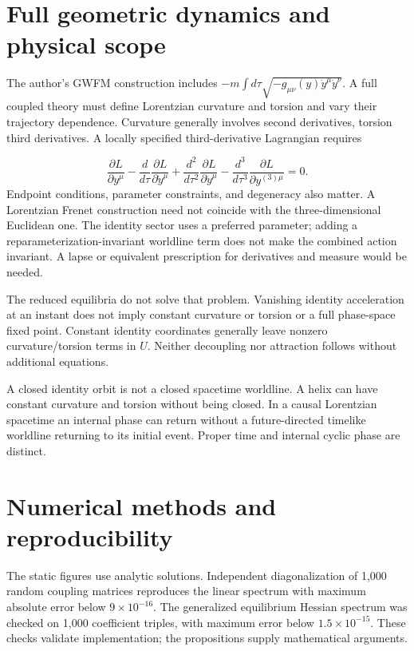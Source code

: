 \documentclass[aip,adv,preprint,floatfix]{revtex4-2}
\begin{document}
\section{Full geometric dynamics and physical scope}
The author's GWFM construction \cite{r1} includes $-m\int d\tau\sqrt{-g_{\mu\nu}(y)\dot y^\mu\dot y^\nu}$. A full coupled theory must define Lorentzian curvature and torsion and vary their trajectory dependence. Curvature generally involves second derivatives, torsion third derivatives. A locally specified third-derivative Lagrangian requires

\begin{equation}
\frac{\partial L}{\partial y^\mu}-\frac{d}{d\tau}\frac{\partial L}{\partial\dot y^\mu}+\frac{d^2}{d\tau^2}\frac{\partial L}{\partial\ddot y^\mu}-\frac{d^3}{d\tau^3}\frac{\partial L}{\partial y^{(3)\mu}}=0.
\end{equation}
Endpoint conditions, parameter constraints, and degeneracy also matter. A Lorentzian Frenet construction need not coincide with the three-dimensional Euclidean one. The identity sector uses a preferred parameter; adding a reparameterization-invariant worldline term does not make the combined action invariant. A lapse or equivalent prescription for derivatives and measure would be needed.

The reduced equilibria do not solve that problem. Vanishing identity acceleration at an instant does not imply constant curvature or torsion or a full phase-space fixed point. Constant identity coordinates generally leave nonzero curvature/torsion terms in $U$. Neither decoupling nor attraction follows without additional equations.

A closed identity orbit is not a closed spacetime worldline. A helix can have constant curvature and torsion without being closed. In a causal Lorentzian spacetime an internal phase can return without a future-directed timelike worldline returning to its initial event. Proper time and internal cyclic phase are distinct.

\section{Numerical methods and reproducibility}
The static figures use analytic solutions. Independent diagonalization of 1,000 random coupling matrices reproduces the linear spectrum with maximum absolute error below $9\times10^{-16}$. The generalized equilibrium Hessian spectrum was checked on 1,000 coefficient triples, with maximum error below $1.5\times10^{-15}$. These checks validate implementation; the propositions supply mathematical arguments.
\end{document}
